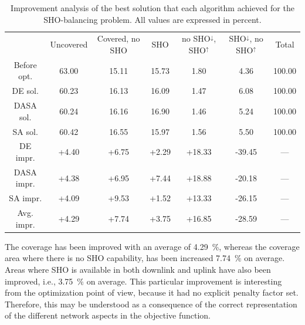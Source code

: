 \begin{table}
\centering

\caption{Improvement analysis of the best solution that each algorithm achieved
for the SHO-balancing problem. All values are expressed in percent.\textit{\label{tab:07-Optimization_result_analysis}}}


{\scriptsize{}}%
\begin{tabular}{ccccccc}
\cmidrule{2-7} 
 & {\scriptsize{Uncovered}} & {\scriptsize{Covered, no SHO}} & {\scriptsize{SHO}} & {\scriptsize{no SHO$^{\downarrow}$, SHO$^{\uparrow}$}} & {\scriptsize{SHO$^{\downarrow}$, no SHO$^{\uparrow}$}} & {\scriptsize{Total}}\tabularnewline\addlinespace
\midrule
{\scriptsize{Before opt.}} & {\scriptsize{63.00}} & {\scriptsize{15.11}} & {\scriptsize{15.73}} & {\scriptsize{1.80}} & {\scriptsize{4.36}} & {\scriptsize{100.00}}\tabularnewline
\cmidrule{2-7} 
{\scriptsize{DE sol.}} & {\scriptsize{60.23}} & {\scriptsize{16.13}} & {\scriptsize{16.09}} & {\scriptsize{1.47}} & {\scriptsize{6.08}} & {\scriptsize{100.00}}\tabularnewline
{\scriptsize{DASA sol.}} & {\scriptsize{60.24}} & {\scriptsize{16.16}} & {\scriptsize{16.90}} & {\scriptsize{1.46}} & {\scriptsize{5.24}} & {\scriptsize{100.00}}\tabularnewline
{\scriptsize{SA sol.}} & {\scriptsize{60.42}} & {\scriptsize{16.55}} & {\scriptsize{15.97}} & {\scriptsize{1.56}} & {\scriptsize{5.50}} & {\scriptsize{100.00}}\tabularnewline
\cmidrule{2-7} 
{\scriptsize{DE impr.}} & {\scriptsize{+4.40}} & {\scriptsize{+6.75}} & {\scriptsize{+2.29}} & {\scriptsize{+18.33}} & {\scriptsize{-39.45}} & {\scriptsize{---}}\tabularnewline
{\scriptsize{DASA impr.}} & {\scriptsize{+4.38}} & {\scriptsize{+6.95}} & {\scriptsize{+7.44}} & {\scriptsize{+18.88}} & {\scriptsize{-20.18}} & {\scriptsize{---}}\tabularnewline
{\scriptsize{SA impr.}} & {\scriptsize{+4.09}} & {\scriptsize{+9.53}} & {\scriptsize{+1.52}} & {\scriptsize{+13.33}} & {\scriptsize{-26.15}} & {\scriptsize{---}}\tabularnewline
\cmidrule{2-7} 
{\scriptsize{Avg. impr.}} & {\scriptsize{+4.29}} & {\scriptsize{+7.74}} & {\scriptsize{+3.75}} & {\scriptsize{+16.85}} & {\scriptsize{-28.59}} & {\scriptsize{---}}\tabularnewline
\bottomrule
\end{tabular}
\end{table}


The coverage has been improved with an average of 4.29~\%, whereas
the coverage area where there is no SHO capability, has been increased
7.74~\% on average. Areas where SHO is available in both downlink
and uplink have also been improved, i.e., 3.75~\% on average. This
particular improvement is interesting from the optimization point
of view, because it had no explicit penalty factor set. Therefore,
this may be understood as a consequence of the correct representation
of the different network aspects in the objective function.

